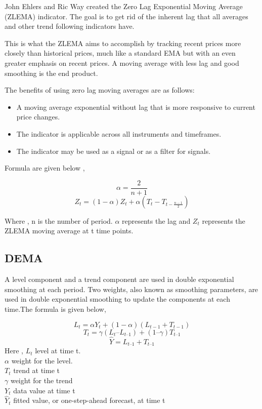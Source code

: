\documentclass{article}
\providecommand{\tightlist}{%
  \setlength{\itemsep}{0pt}\setlength{\parskip}{0pt}}
\begin{document}
John Ehlers and Ric Way created the Zero Lag Exponential Moving Average
(ZLEMA) indicator. The goal is to get rid of the inherent lag that all
averages and other trend following indicators have.

This is what the ZLEMA aims to accomplish by tracking recent prices more
closely than historical prices, much like a standard EMA but with an
even greater emphasis on recent prices. A moving average with less lag
and good smoothing is the end product.

The benefits of using zero lag moving averages are as follows:

\begin{itemize}
\tightlist
\item
  A moving average exponential without lag that is more responsive to
  current price changes.
\item
  The indicator is applicable across all instruments and timeframes.
\item
  The indicator may be used as a signal or as a filter for signals.
\end{itemize}

Formula are given below ,

\[
\alpha = \frac{2}{n+1}  
\] \[
Z_{t} = (1 - \alpha)Z_t + \alpha (T_t - T_{t-\frac{n-1}{2}})
\]

Where , n is the number of period. \(\alpha\) represents the lag and
\(Z_t\) represents the ZLEMA moving average at t time points.

\hypertarget{dema}{%
\subsection{DEMA}\label{dema}}

A level component and a trend component are used in double exponential
smoothing at each period. Two weights, also known as smoothing
parameters, are used in double exponential smoothing to update the
components at each time.The formula is given below,

\[
L_{t} = \alpha Y_{t} + (1-\alpha)(L_{t-1} + T_{t-1})
\] \[
T_t = \gamma (L_t – L_{t –1}) + (1 – \gamma) T_{t –1} 
\] \[
\hat Y= L_{t –1} + T_{t –1}
\] Here , \(L_t\) level at time t.\\
\(\alpha\) weight for the level.\\
\(T_t\) trend at time t\\
\(\gamma\) weight for the trend\\
\(Y_t\) data value at time t\\
\(\hat Y_t\) fitted value, or one-step-ahead forecast, at time t\\
\end{document}
